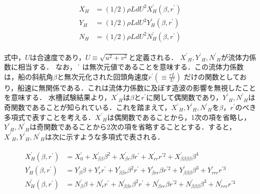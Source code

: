 \begin{align}
    \begin{split}
        X_{H} &=(1 / 2) \rho L d U^{2} X_{H}^{\prime}\left(\beta, r^{\prime}\right) \\
        Y_{H} &=(1 / 2) \rho L d U^{2} Y_{H}^{\prime}\left(\beta, r^{\prime}\right) \\
        N_{H} &=(1 / 2) \rho L d U^{2} N_{H}^{\prime}\left(\beta, r^{\prime}\right) \label{eq:2-26}
    \end{split}
\end{align}

式中，$U$は合速度であり，$U\equiv\sqrt{u^2+v^2}$と定義される．
${X^{\prime}}_H, {Y^{\prime}}_H, {N^{\prime}}_H$が流体力係数に相当する．
なお，$´$ は無次元値であることを意味する．この流体力係数は，船の斜航角$\beta$と無次元化された回頭角速度$r^{\prime}(\equiv \frac{rL}{U})$  だけの関数としており，船速に無関係である．これは流体力係数に及ぼす造波の影響を無視したことを意味する．
水槽試験結果より，${X^{\prime}}_H$は$\beta$と$r^{\prime}$に関して偶関数であり，${Y^{\prime}}_H,{N^{\prime}}_H $は奇関数であることが知られている．これを踏まえて，${X^{\prime}}_H, {Y^{\prime}}_H, {N^{\prime}}_H$を$\beta，r^{\prime}$のべき多項式で表すことを考える．${X^{\prime}}_H$は偶関数であることから，1次の項を省略し，${Y^{\prime}}_H,{N^{\prime}}_H$は奇関数であることから2次の項を省略することとする．すると，${X^{\prime}}_H,{Y^{\prime}}_H,{N^{\prime}}_H$は次に示すような多項式で表される．


\begin{align}
    \begin{split}
        X_{H}^{\prime}\left(\beta, r^{\prime}\right)&=X_{0}^{\prime}+X_{\beta \beta}^{\prime} \beta^{2}+X_{\beta r}^{\prime} \beta r^{\prime}+X_{r r}^{\prime} r^{\prime 2}+X_{\beta \beta \beta \beta}^{\prime} \beta^{4} \\
        Y_{H}^{\prime}\left(\beta, r^{\prime}\right)&=Y_{\beta}^{\prime} \beta+Y_{r}^{\prime} r^{\prime}+Y_{\beta \beta r}^{\prime} \beta^{2} r^{\prime}+Y_{\beta r r}^{\prime} \beta r^{\prime 2}+Y_{\beta \beta \beta}^{\prime} \beta^{3}+Y_{r r r}^{\prime} r^{\prime 3} \\
        N_{H}^{\prime}\left(\beta, r^{\prime}\right)&=N_{\beta}^{\prime} \beta+N_{r}^{\prime} r^{\prime}+N_{\beta \beta r}^{\prime} \beta^{2} r^{\prime}+N_{\beta r r}^{\prime} \beta r^{\prime 2}+N_{\beta \beta \beta}^{\prime} \beta^{3}+N_{r r r}^{\prime} r^{\prime 3} \label{eq:2-27}
    \end{split}
\end{align}

